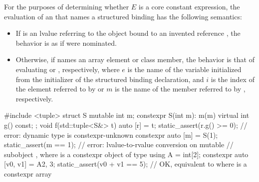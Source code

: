 \pnum
For the purposes of determining whether $E$ is a core constant expression,
the evaluation of an 
that names a structured binding  has the
following semantics:
\begin{itemize}
\item
If  is an lvalue referring to the object bound to an invented reference ,
the behavior is as if  were nominated.
\item
Otherwise, if  names an array element or class member,
the behavior is that of
evaluating  or , respectively,
where $e$ is the name of the variable
initialized from the initializer of the structured binding declaration, and
$i$ is the index of the element referred to by  or
$m$ is the name of the member referred to by , respectively.
\end{itemize}
\begin{example}
\begin{codeblock}
#include <tuple>
struct S {
  mutable int m;
  constexpr S(int m): m(m) {}
  virtual int g() const;
};
void f(std::tuple<S&> t) {
  auto [r] = t;
  static_assert(r.g() >= 0);            // error: dynamic type is constexpr-unknown
  constexpr auto [m] = S(1);
  static_assert(m == 1);                // error: lvalue-to-rvalue conversion on mutable
                                        // subobject , where  is a constexpr object of type 
  using A = int[2];
  constexpr auto [v0, v1] = A{2, 3};
  static_assert(v0 + v1 == 5);          // OK, equivalent to  where  is a constexpr array
}
\end{codeblock}
\end{example}

